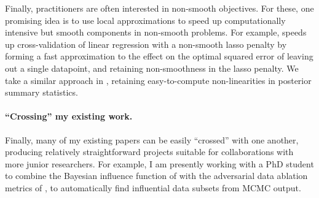 Finally, practitioners are often interested in non-smooth objectives. For these,
one promising idea is to use local approximations to speed up computationally
intensive but smooth components in non-smooth problems. For example,
\citet{wilson:2020:approximatecv} speeds up cross-validation of linear
regression with a non-smooth lasso penalty by forming a fast approximation to
the effect on the optimal squared error of leaving out a single datapoint, and
retaining non-smoothness in the lasso penalty. We take a similar approach in
\citet{giordano:2021:bnpsensitivity}, retaining easy-to-compute non-linearities
in posterior summary statistics.


\paragraph{``Crossing'' my existing work.}

Finally, many of my existing papers can be easily ``crossed'' with one another, producing
relatively straightforward projects suitable for collaborations with more junior
researchers.  For example, I am presently working with a PhD student to combine
the Bayesian influence function of \citet{giordano:2021:bayesij} with the
adversarial data ablation metrics of \citet{giordano:2020:amip}, to
automatically find influential data subsets from MCMC output.


\newpage





